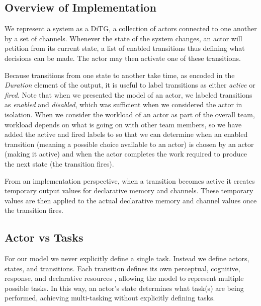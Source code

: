 


\subsection{Overview of Implementation}
We represent a system as a DiTG, a collection of
actors connected to one another by a set of channels.  Whenever the state of the
system changes, an actor will petition from its current state, a list of enabled
transitions thus defining what decisions can be made.  The actor may then
activate one of these transitions.  

Because transitions from one state to another take time, as encoded in the {\em Duration} element of the output, it is useful to label transitions as either {\em active} or {\em fired}.  Note that when we presented the model of an actor, we labeled transitions as {\em enabled} and {\em disabled}, which was sufficient when we considered the actor in isolation.  When we consider the workload of an actor as part of the overall team, workload depends on what is going on with other team members, so we have added the active and fired labels to so that we can determine when an enabled transition (meaning a possible choice available to an actor) is chosen by an actor (making it active) and when the actor completes the work required to produce the next state (the transition fires).  

From an implementation perspective, when a transition becomes active it creates temporary
output values for declarative memory and channels.  These temporary values are
then applied to the actual declarative memory and channel values once the transition fires.

\subsection{Actor vs Tasks}
For our model we never explicitly define a single task.  Instead
we define actors, states, and transitions.  Each transition defines its own
perceptual, cognitive, response, and declarative resources \cite{salvucci2008threaded}, allowing the model to represent multiple possible tasks.  In this way, an actor's state
determines what task(s) are being performed, achieving multi-tasking without
explicitly defining tasks. 

